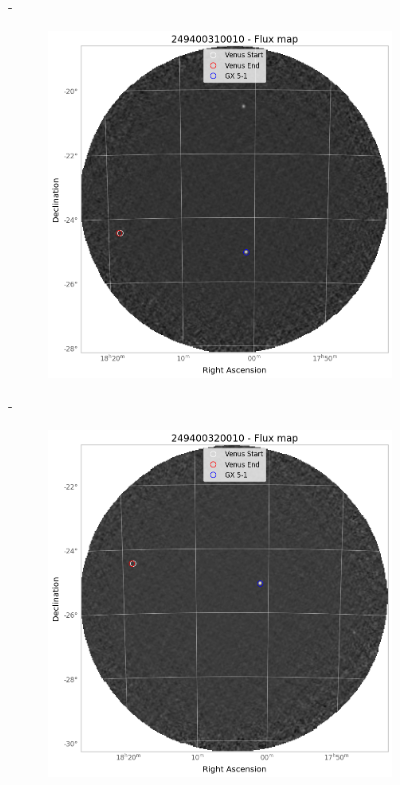 \documentclass[
	a4paper, %
	10pt, %
	unnumberedsections, %
	twoside, %
]{LTJournalArticle}
\begin{document}
\begin{figure}[H]
\begin{subfigure}{.3\textwidth}
        \end{subfigure}
        \hspace{1em}-
        \begin{subfigure}{.3\textwidth}
            \centering
            \includegraphics[width=\textwidth]{report/Figures/methods/2204/31_map.png}
        \end{subfigure}
        \hspace{1em}-
        \begin{subfigure}{.3\textwidth}
            \centering
            \includegraphics[width=\textwidth]{report/Figures/methods/2204/32_map.png}

\end{subfigure}
\end{figure}
\end{document}

